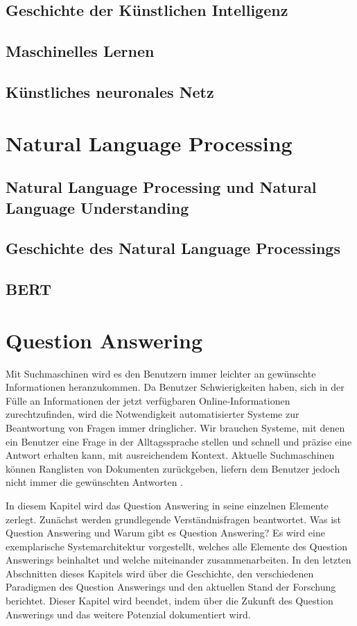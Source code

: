 \documentclass[
        ngerman,
        paper=a4,
        numbers=noendperiod,
]{scrreprt}
\begin{document}
\subsection{Geschichte der Künstlichen Intelligenz}
\subsection{Maschinelles Lernen}
\subsection{Künstliches neuronales Netz}

\section{Natural Language Processing}
\subsection{Natural Language Processing und Natural Language Understanding}
\subsection{Geschichte des Natural Language Processings}
\subsection{BERT}


\section{Question Answering} %
Mit Suchmaschinen wird es den Benutzern immer leichter an gewünschte Informationen heranzukommen. Da Benutzer Schwierigkeiten haben, sich in der Fülle an Informationen der jetzt verfügbaren Online-Informationen zurechtzufinden, wird die Notwendigkeit automatisierter Systeme zur Beantwortung von Fragen immer dringlicher. Wir brauchen Systeme, mit denen ein Benutzer eine Frage in der Alltagssprache stellen und schnell und präzise eine Antwort erhalten kann, mit ausreichendem Kontext. Aktuelle Suchmaschinen können Ranglisten von Dokumenten zurückgeben, liefern dem Benutzer jedoch nicht immer die gewünschten Antworten \citep[S. 275]{Hirschman2001NaturalHere}.

In diesem Kapitel wird das Question Answering in seine einzelnen Elemente zerlegt. Zunächst werden grundlegende Verständnisfragen beantwortet. Was ist Question Answering und Warum gibt es Question Answering?
Es wird eine exemplarische Systemarchitektur vorgestellt, welches alle Elemente des Question Answerings beinhaltet und welche miteinander zusammenarbeiten. 
In den letzten Abschnitten dieses Kapitels wird über die Geschichte, den verschiedenen Paradigmen des Question Answerings und den aktuellen Stand der Forschung berichtet. Dieser Kapitel wird beendet, indem über die Zukunft des Question Answerings und das weitere Potenzial dokumentiert wird.
\end{document}
